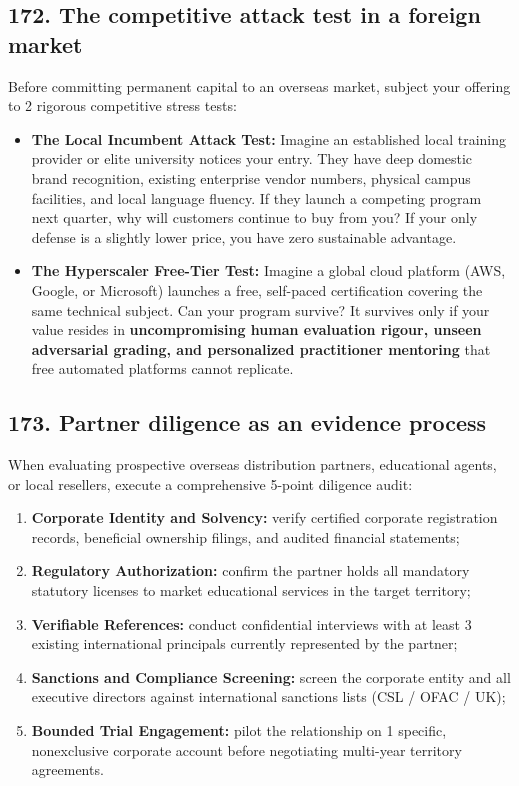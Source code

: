 \subsection{172. The competitive attack test in a foreign market}

Before committing permanent capital to an overseas market, subject your offering to 2 rigorous competitive stress tests:
\begin{itemize}
    \item \textbf{The Local Incumbent Attack Test:} Imagine an established local training provider or elite university notices your entry. They have deep domestic brand recognition, existing enterprise vendor numbers, physical campus facilities, and local language fluency. If they launch a competing program next quarter, why will customers continue to buy from you? If your only defense is a slightly lower price, you have zero sustainable advantage.
    \item \textbf{The Hyperscaler Free-Tier Test:} Imagine a global cloud platform (AWS, Google, or Microsoft) launches a free, self-paced certification covering the same technical subject. Can your program survive? It survives only if your value resides in \textbf{uncompromising human evaluation rigour, unseen adversarial grading, and personalized practitioner mentoring} that free automated platforms cannot replicate.
\end{itemize}

\subsection{173. Partner diligence as an evidence process}

When evaluating prospective overseas distribution partners, educational agents, or local resellers, execute a comprehensive 5-point diligence audit:
\begin{enumerate}
    \item \textbf{Corporate Identity and Solvency:} verify certified corporate registration records, beneficial ownership filings, and audited financial statements;
    \item \textbf{Regulatory Authorization:} confirm the partner holds all mandatory statutory licenses to market educational services in the target territory;
    \item \textbf{Verifiable References:} conduct confidential interviews with at least 3 existing international principals currently represented by the partner;
    \item \textbf{Sanctions and Compliance Screening:} screen the corporate entity and all executive directors against international sanctions lists (CSL / OFAC / UK);
    \item \textbf{Bounded Trial Engagement:} pilot the relationship on 1 specific, nonexclusive corporate account before negotiating multi-year territory agreements.
\end{enumerate}

